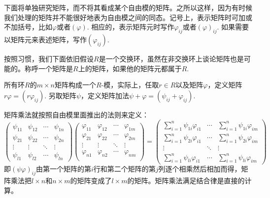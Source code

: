 下面将单独研究矩阵，而不将其看成某个自由模的矩阵。之所以这样，因为有时候我们处理的矩阵并不能很好地表为自由模之间的同态。记号上，表示矩阵时可加或不加括号，比如$\varphi$或者$(\varphi)$. 相应的，表示矩阵元时写作$\varphi_{ij}$或者$(\varphi)_{ij}$. 如果需要以矩阵元来表述矩阵，写作$(\varphi_{ij})$. 

按照习惯，我们下面依旧假设$R$是一个交换环，虽然在非交换环上谈论矩阵也是可能的。称呼一个矩阵是$R$上的矩阵，如果他的矩阵元都属于$R$.

所有环$R$的$m\times n$矩阵构成一个$R$-模，实际上，任取$r\in R$以及矩阵$\varphi$，定义矩阵$r\varphi= (r\varphi_{ij})$. 另取矩阵$\psi$，定义矩阵加法$\psi+\varphi=(\psi_{ij}+\varphi_{ij})$.

矩阵乘法就按照自由模里面推出的法则来定义：
\begin{equation}
\begin{pmatrix}
	\psi_{11} & \psi_{12} & \cdots & \psi_{1n}\\
	\psi_{21} & \psi_{22} & \cdots & \psi_{2n}\\
	\vdots & \vdots & \ddots & \vdots \\
	\psi_{l1} & \psi_{l2} & \cdots & \psi_{ln}
\end{pmatrix}
\begin{pmatrix}
	\varphi_{11} & \varphi_{12} & \cdots & \varphi_{1m}\\
	\varphi_{21} & \varphi_{22} & \cdots & \varphi_{2m}\\
	\vdots & \vdots & \ddots & \vdots \\
	\varphi_{n1} & \varphi_{n2} & \cdots & \varphi_{nm}\\
\end{pmatrix}
=
\begin{pmatrix}
	\sum_{i=1}^n \psi_{1i}\varphi_{i1} & \cdots & \sum_{i=1}^n \psi_{1i}\varphi_{im}\\
	\sum_{i=1}^n \psi_{2i}\varphi_{i1} & \cdots & \sum_{i=1}^n \psi_{2i}\varphi_{im}\\
	\vdots & \ddots & \vdots \\
	\sum_{i=1}^n \psi_{li}\varphi_{i1} & \cdots & \sum_{i=1}^n \psi_{li}\varphi_{im}
\end{pmatrix}
\end{equation}
即$(\psi\varphi)_{ij}$由第一个矩阵的第$i$行和第二个矩阵的第$j$列逐个相乘然后相加而得，矩阵乘法把$l\times n$和$n \times m$的矩阵变成了$l \times m$的矩阵。矩阵乘法满足结合律是直接的计算。

